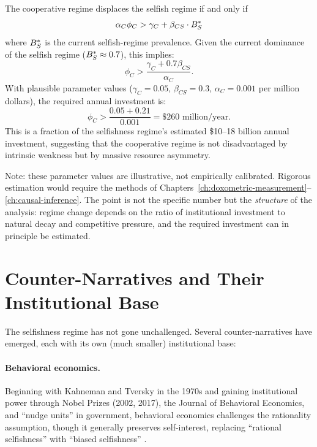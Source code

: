 \begin{proposition}
\label{prop:funding-threshold}
The cooperative regime displaces the selfish regime if and only if
\[
  \alpha_C \phi_C > \gamma_C + \beta_{CS} \cdot B_{S}^*
\]
where $B_{S}^*$ is the current selfish-regime prevalence.
Given the current dominance of the selfish regime ($B_{S}^* \approx 0.7$), this implies:
\[
  \phi_C > \frac{\gamma_C + 0.7 \beta_{CS}}{\alpha_C}.
\]
With plausible parameter values ($\gamma_C = 0.05$, $\beta_{CS} = 0.3$, $\alpha_C = 0.001$ per million dollars), the required annual investment is:
\[
  \phi_C > \frac{0.05 + 0.21}{0.001} = \$260 \text{ million/year.}
\]
This is a fraction of the selfishness regime's estimated \$10--18 billion annual investment, suggesting that the cooperative regime is not disadvantaged by intrinsic weakness but by massive resource asymmetry.
\end{proposition}

Note: these parameter values are illustrative, not empirically calibrated.
Rigorous estimation would require the methods of Chapters~\ref{ch:doxometric-measurement}--\ref{ch:causal-inference}.
The point is not the specific number but the \emph{structure} of the analysis: regime change depends on the ratio of institutional investment to natural decay and competitive pressure, and the required investment can in principle be estimated.

\section{Counter-Narratives and Their Institutional Base}
\label{sec:ch21-counter}

The selfishness regime has not gone unchallenged.
Several counter-narratives have emerged, each with its own (much smaller) institutional base:

\paragraph{Behavioral economics.}
Beginning with Kahneman and Tversky in the 1970s and gaining institutional power through Nobel Prizes (2002, 2017), the Journal of Behavioral Economics, and ``nudge units'' in government, behavioral economics challenges the rationality assumption, though it generally preserves self-interest, replacing ``rational selfishness'' with ``biased selfishness'' \autocite{kahneman2011}.

